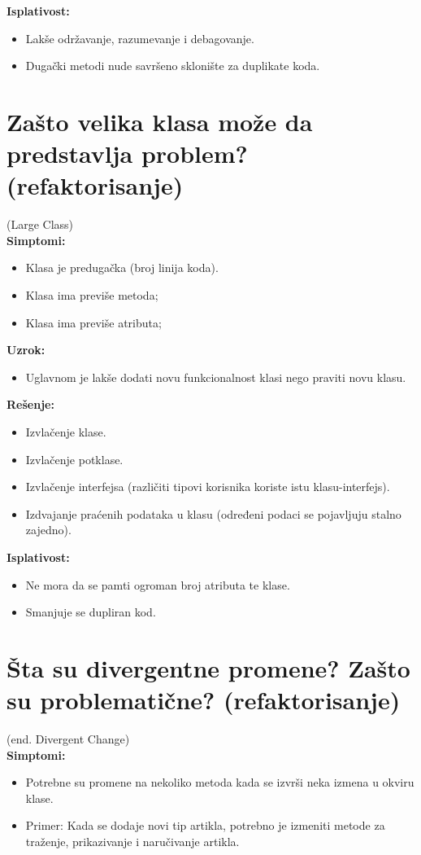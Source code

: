 \documentclass[a4paper]{article}
\begin{document}
  \noindent \textbf{Isplativost:} 
  \begin{itemize}
    \item Lakše održavanje, razumevanje i debagovanje.
    \item Dugački metodi nude savršeno sklonište za duplikate koda.
  \end{itemize}

\section{Zašto velika klasa može da predstavlja problem? (refaktorisanje)}
  (Large Class)\\
  \textbf{Simptomi:}
  \begin{itemize}
    \item Klasa je predugačka (broj linija koda).
    \item Klasa ima previše metoda;
    \item Klasa ima previše atributa;
  \end{itemize}

  \noindent \textbf{Uzrok:} 
  \begin{itemize}
    \item Uglavnom je lakše dodati novu funkcionalnost klasi nego praviti novu klasu.
  \end{itemize}

  \noindent \textbf{Rešenje:} 
  \begin{itemize}
    \item Izvlačenje klase.
    \item Izvlačenje potklase.
    \item Izvlačenje interfejsa (različiti tipovi korisnika koriste istu klasu-interfejs).
    \item Izdvajanje praćenih podataka u klasu (određeni podaci se pojavljuju stalno zajedno).
  \end{itemize}

  \noindent \textbf{Isplativost:} 
  \begin{itemize}
    \item Ne mora da se pamti ogroman broj atributa te klase.
    \item Smanjuje se dupliran kod.
  \end{itemize}

\section{Šta su divergentne promene? Zašto su problematične? (refaktorisanje)}
  (end. Divergent Change)\\
  \textbf{Simptomi:}
  \begin{itemize}
    \item Potrebne su promene na nekoliko metoda kada se izvrši neka izmena u okviru klase.
    \item Primer: Kada se dodaje novi tip artikla, potrebno je izmeniti metode za traženje,
          prikazivanje i naručivanje artikla.
  \end{itemize}
\end{document}
